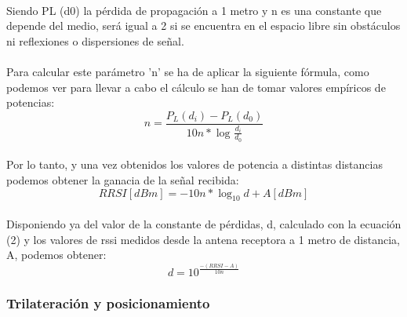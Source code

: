 \documentclass[a4paper ,12pt, onecolumn]{article}
\begin{document}
                \paragraph{}
                Siendo PL (d0)  la pérdida de propagación a 1 metro y n es una constante que depende del medio, será igual
                a 2 si se encuentra en el espacio libre sin obstáculos ni reflexiones o dispersiones de señal.
                \paragraph{}
                Para calcular este parámetro 'n' se ha de aplicar la siguiente fórmula, como podemos ver para llevar a cabo el 
                cálculo se han de tomar valores empíricos de potencias:
                \begin{equation}
                    n = \frac{ P_L(d_i) - P_L(d_0) }{10n*\log_{}\frac{d_i}{d_0}}
                \end{equation}
                \paragraph{}
                Por lo tanto, y una vez obtenidos los valores de potencia a distintas distancias podemos obtener la ganacia
                de la señal recibida:
                \begin{equation}
                    RRSI [dBm] = -10n*\log_{10} d+ A[dBm]
                \end{equation}
                \paragraph{}
                Disponiendo ya del valor de la constante de pérdidas, d, calculado con la ecuación (2) y los valores
                de rssi medidos desde la antena receptora a 1 metro de distancia, A, podemos obtener:
                \begin{equation}
                    d= 10^\frac{-(RRSI - A)}{10n}
                \end{equation}
            \subsubsection{Trilateración y posicionamiento}
            
\end{document}
